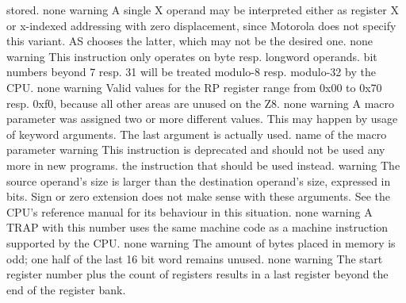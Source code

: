 \documentclass[12pt,twoside]{report}
\newcommand{\asname}{{AS}}
\begin{document}
\begin{description}
{                stored.}
               {none}
               {warning}
               {A single X operand may be interpreted either as register X
                or x-indexed addressing with zero displacement, since
                Motorola does not specify this variant.  \asname{} chooses the
                latter, which may not be the desired one.}
               {none}
               {warning}
               {This instruction only operates on byte resp. longword
                operands.  bit numbers beyond 7 resp. 31 will be treated
                modulo-8 resp. modulo-32 by the CPU.}
               {none}
               {warning}
               {Valid values for the RP register range from 0x00 to 0x70 resp.
                0xf0, because all other areas are unused on the Z8.}
               {none}
               {warning}
               {A macro parameter was assigned two or more
                different values.  This may happen by usage of
                keyword arguments.  The last argument is actually
                used.}
               {name of the macro parameter}
               {warning}
               {This instruction is deprecated and should not be used any
                more in new programs.}
               {the instruction that should be used instead.}
               {warning}
               {The source operand's size is larger than the destination operand's
                size, expressed in bits.  Sign or zero extension does not make sense
                with these arguments.  See the CPU's reference manual for its behaviour
                in this situation.}
               {none}
               {warning}
               {A TRAP with this number uses the same machine code as a 
                machine instruction supported by the CPU.}
               {none}
               {warning}
               {The amount of bytes placed in memory is odd; one half of the last
                16 bit word remains unused.}
               {none}
               {warning}
               {The start register number plus the count of registers results
                in a last register beyond the end of the register bank.}

\end{description}
\end{document}
